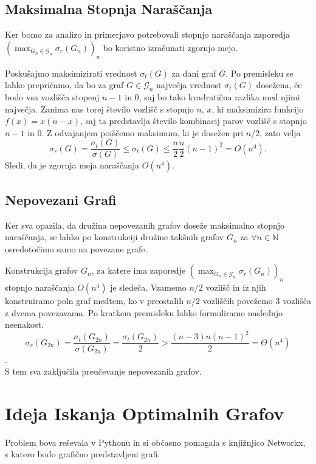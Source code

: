 \documentclass[ letterpaper, titlepage, fleqn]{article}
\begin{document}
\subsection{Maksimalna Stopnja Naraščanja}
Ker bomo za analizo in primerjavo potrebovali stopnjo naraščanja
zaporedja $(\max_{G_n \in \mathscr{G}_n} \sigma_r(G_n))_n$ bo koristno izračunati zgornjo mejo.

Poskušajmo maksimizirati vrednost $\sigma_t(G)$ za dani graf $G$.
Po premisleku se lahko prepričamo, da bo za graf $G \in \mathscr{G}_n$ največja vrednost $\sigma_t(G)$ dosežena, če
bodo vsa vozlišča stopenj $n - 1$ in $0$, saj bo tako kvadratična razlika med njimi največja.
Zanima nas torej število vozlišč s stopnjo $n$, $x$, ki maksimizira funkcijo
$f(x) = x (n - x)$, saj ta predstavlja število kombinacij parov vozlišč s stopnjo $n - 1$ in $0$.
Z odvajanjem poiščemo maksimum, ki je dosežen pri $n / 2$, zato velja
$$
\sigma_r(G) = \frac{\sigma_t(G)}{\sigma(G)} 
\leq \sigma_t(G) \leq \frac{n}{2} \frac{n}{2} (n - 1)^2 
= O(n^4).
$$
Sledi, da je zgornja meja naraščanja $O(n^4)$.

\subsection{Nepovezani Grafi}
Ker sva opazila, da družina nepovezanih grafov doseže maksimalno stopnjo naraščanja,
se lahko po konstrukciji družine takšnih grafov $G_n$ za $\forall n \in \mathbb{N}$
osredotočimo samo na povezane grafe.

Konstrukcija grafov $G_n$, za katere ima zaporedje  $(\max_{G_n \in \mathscr{G}_n} \sigma_r(G_n))_n$  stopnjo 
naraščanja $O(n^4)$ je sledeča.
Vzamemo $n / 2$ vozlišč in iz njih konstruiramo poln graf
medtem, ko v preostalih $n /2$ vozliščih povežemo 3 vozlišča z dvema povezavama.
Po kratkem premisleku lahko formuliramo naslednjo neenakost.
$$\sigma_r(G_{2n}) = \frac{\sigma_t(G_{2n})}{\sigma(G_{2n})} =  \frac{\sigma_t(G_{2n})}{2}  > \frac{(n - 3) n (n - 1)^2}{2} = \Theta(n^4)$$.
\\
S tem sva zaključila preučevanje nepovezanih grafov.

\section{Ideja Iskanja Optimalnih Grafov}
Problem bova reševala v Pythonu in si občasno pomagala s knjižnjico Networkx,  
s katero bodo grafično predstavljeni grafi.
\end{document}
